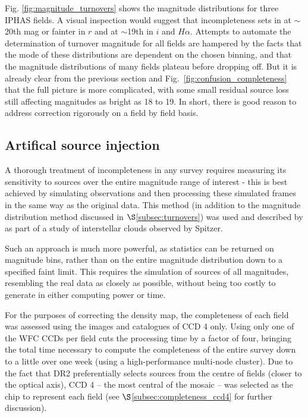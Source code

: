 \documentclass[a4paper,useAMS,usenatbib]{mn2e}
\begin{document}
Fig. \ref{fig:magnitude_turnovers} shows the magnitude distributions for three IPHAS fields. 
A visual inspection would suggest that incompleteness sets in at $\sim$20th mag or fainter in
$r$ and at $\sim$19th in $i$ and $H\alpha$. Attempts to automate the determination of turnover 
magnitude for all fields are hampered by the facts that the mode of these distributions are 
dependent on the chosen binning, and that the magnitude distributions of many fields plateau 
before dropping off.  But it is already clear from the previous section and 
Fig.~\ref{fig:confusion_completeness} that the full picture is more complicated, with some small 
residual source loss still affecting magnitudes as bright as 18 to 19. In short, there is good reason 
to address correction rigorously on a field by field basis. 


\subsection{Artifical source injection}  
A thorough treatment of incompleteness in any survey requires measuring its
sensitivity to sources over the entire magnitude range of interest - this is best achieved 
by simulating observations and then processing these simulated frames in the same way as 
the original data. This method (in addition to the magnitude distribution method 
discussed in $\S$\ref{subsec:turnovers}) was used and described by \citet{Harvey2006} as part 
of a study of interstellar clouds observed by Spitzer.

Such an approach is much more powerful, as statistics can be returned on
magnitude bins, rather than on the entire magnitude distribution down to a
specified faint limit. This requires the simulation of sources of all
magnitudes, resembling the real data as closely as possible, without being too
costly to generate in either computing power or time.

For the purposes of correcting the density map, the completeness of each field
was assessed using the images and catalogues of CCD 4 only. Using only one of
the WFC CCDs per field cuts the processing time by a factor of four, bringing
the total time necessary to compute the completeness of the entire survey down
to a little over one week (using a high-performance multi-node cluster). Due to the 
fact that DR2 preferentially selects sources from the centre of fields (closer to the 
optical axis), CCD 4 -- the most central of the mosaic -- was selected as the chip 
to represent each field (see $\S$\ref{subsec:completeness_ccd4} for further discussion).
\end{document}
